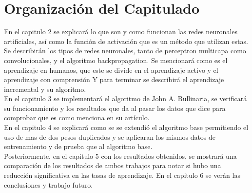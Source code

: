 
\section{Organización del Capitulado}


	En el capitulo 2 se explicar\'a lo que son y como funcionan las redes neuronales artificiales, así como la función de activación que es un método que utilizan estas.
	 Se describir\'an los tipos de redes neuronales, tanto de perceptron multicapa como convolucionales, y el algoritmo backpropagation.
	 Se mencionar\'a como es el aprendizaje en humanos, que este se divide en el aprendizaje activo y el aprendizaje con comprensión
	 Y para terminar se describirá el aprendizaje incremental y su algoritmo.\\
	 
	 En el capitulo 3 se implementar\'a el algoritmo de John A. Bullinaria, se verificar\'a su funcionamiento y los resultados que da al pasar los datos que dice para comprobar que es como menciona en su art\'iculo.\\
	 En el capitulo 4 se explicar\'a como se se extendió el algoritmo base permitiendo el uso de mas de dos pesos duplicados y se aplicaran los mismos datos de entrenamiento y de prueba que al algoritmo base.\\
	 
	 Posteriormente, en el capitulo 5 con los resultados obtenidos, se mostrar\'a una comparación de los resultados de ambos trabajos para notar si hubo una reducción significativa en las tasas de aprendizaje. En el capitulo 6 se verán las conclusiones y trabajo futuro.